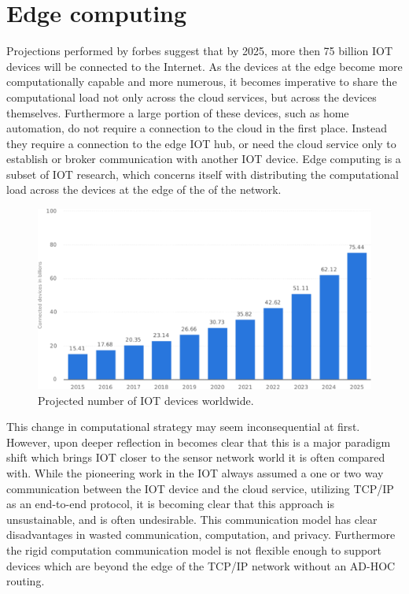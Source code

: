 \section{Edge computing}
Projections performed by forbes suggest that by 2025, more then 75 billion IOT devices will be connected to the Internet.\cite{forbesiot} As the devices at the edge become more computationally capable and more numerous, it becomes imperative to share the computational load not only across the cloud services, but across the devices themselves. Furthermore a large portion of these devices, such as home automation, do not require a connection to the cloud in the first place. Instead they require a connection to the edge IOT hub, or need the cloud service only to establish or broker communication with another IOT device. Edge computing is a subset of IOT research, which concerns itself with distributing the computational load across the devices at the edge of the of the network. \cite{satyanarayanan2017emergence}
\begin{figure}[h]
	\centering
	\includegraphics[width=0.8\linewidth]{img/iot_statistics.pdf}	
	\caption{Projected number of IOT devices worldwide.\cite{forbesiot}}
	\label{lit:fig:1}
\end{figure}

This change in computational strategy may seem inconsequential at first. However, upon deeper reflection in becomes clear that this is a major paradigm shift which brings IOT closer to the sensor network world it is often compared with. While the pioneering work in the IOT always assumed a one or two way communication between the IOT device and the cloud service, utilizing TCP/IP as an end-to-end protocol, it is becoming clear that this approach is unsustainable, and is often undesirable. This communication model has clear disadvantages in wasted communication, computation, and privacy. Furthermore the rigid computation communication model is not flexible enough to support devices which are beyond the edge of the TCP/IP network without an AD-HOC routing. \cite{gagliardi2011content}

